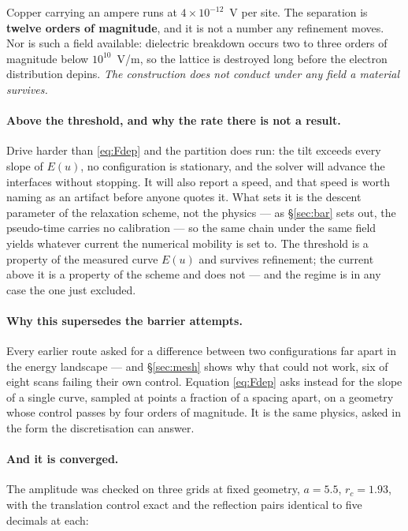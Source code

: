 \documentclass[11pt]{article}
\begin{document}
Copper carrying an ampere runs at $4\times10^{-12}$~V per site. The separation is \textbf{twelve
orders of magnitude}, and it is not a number any refinement moves. Nor is such a field available:
dielectric breakdown occurs two to three orders of magnitude below $10^{10}$~V/m, so the lattice is
destroyed long before the electron distribution depins. \emph{The construction does not conduct
under any field a material survives.}

\paragraph{Above the threshold, and why the rate there is not a result.} Drive harder than
\eqref{eq:Fdep} and the partition does run: the tilt exceeds every slope of $E(u)$, no configuration
is stationary, and the solver will advance the interfaces without stopping. It will also report a
speed, and that speed is worth naming as an artifact before anyone quotes it. What sets it is the
descent parameter of the relaxation scheme, not the physics --- as \S\ref{sec:bar} sets out, the
pseudo-time carries no calibration --- so the same chain under the same field yields whatever current
the numerical mobility is set to. The threshold is a property of the measured curve $E(u)$ and
survives refinement; the current above it is a property of the scheme and does not --- and the
regime is in any case the one just excluded.

\paragraph{Why this supersedes the barrier attempts.} Every earlier route asked for a difference
between two configurations far apart in the energy landscape --- and \S\ref{sec:mesh} shows why that
could not work, six of eight scans failing their own control. Equation \eqref{eq:Fdep} asks instead
for the slope of a single curve, sampled at points a fraction of a spacing apart, on a geometry
whose control passes by four orders of magnitude. It is the same physics, asked in the form the
discretisation can answer.

\paragraph{And it is converged.} The amplitude was checked on three grids at fixed geometry,
$a=5.5$, $r_c=1.93$, with the translation control exact and the reflection pairs identical to five
decimals at each:
\end{document}
